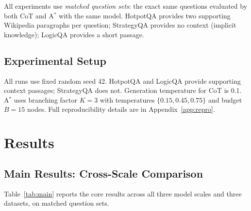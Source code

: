 \documentclass{article}
\newcommand{\astar}{A$^*$\xspace}
\begin{document}
All experiments use \emph{matched question sets}: the exact same questions evaluated by both CoT and \astar with the same model. HotpotQA provides two supporting Wikipedia paragraphs per question; StrategyQA provides no context (implicit knowledge); LogicQA provides a short passage.

\subsection{Experimental Setup}
\label{sec:setup}

All runs use fixed random seed 42. HotpotQA and LogicQA provide supporting context passages; StrategyQA does not. Generation temperature for CoT is 0.1. \astar uses branching factor $K=3$ with temperatures $\{0.15, 0.45, 0.75\}$ and budget $B=15$ nodes. Full reproducibility details are in Appendix~\ref{app:repro}.

\section{Results}
\label{sec:results}

\subsection{Main Results: Cross-Scale Comparison}
\label{sec:main_results}

Table~\ref{tab:main} reports the core results across all three model scales and three datasets, on matched question sets.
\end{document}
